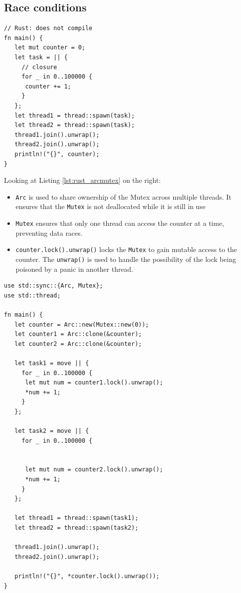 \newpage
\subsection{Race conditions}
\begin{paracol}{2}
   \colfill
\begin{lstlisting}[caption={Broken Rust code},label={lst:rust_broken}]
// Rust: does not compile
fn main() {
   let mut counter = 0;
   let task = || {
     // closure
     for _ in 0..100000 {
      counter += 1;
     }
   };
   let thread1 = thread::spawn(task);
   let thread2 = thread::spawn(task);
   thread1.join().unwrap();
   thread2.join().unwrap();
   println!("{}", counter);
}   
\end{lstlisting}

Looking at Listing \ref{lst:rust_arcmutex} on the right:\ns
\begin{itemize}
   \item \lstinline|Arc| is used to share ownership of the Mutex across multiple threads. It ensures that the \lstinline|Mutex| is not deallocated while it is still in use
   
   \item \lstinline|Mutex| ensures that only one thread can access the counter at a time, preventing data races.
   
   \item \lstinline|counter.lock().unwrap()| locks the \lstinline|Mutex| to gain mutable access to the counter. The \lstinline|unwrap()| is used to handle the possibility of the lock being poisoned by a panic in another thread.
\end{itemize}
   \colfill
   \switchcolumn

\begin{lstlisting}[caption={Fixed code with \lstinline|Arc<Mutex<T>>| and \lstinline|move|},label={lst:rust_arcmutex}]
use std::sync::{Arc, Mutex};
use std::thread;

fn main() {
   let counter = Arc::new(Mutex::new(0));
   let counter1 = Arc::clone(&counter);
   let counter2 = Arc::clone(&counter);

   let task1 = move || {
     for _ in 0..100000 {
      let mut num = counter1.lock().unwrap();
      *num += 1;
     }
   };

   let task2 = move || {
     for _ in 0..100000 {
      

      let mut num = counter2.lock().unwrap();
      *num += 1;
     }
   };

   let thread1 = thread::spawn(task1);
   let thread2 = thread::spawn(task2);

   thread1.join().unwrap();
   thread2.join().unwrap();

   println!("{}", *counter.lock().unwrap());
}   
\end{lstlisting}

\end{paracol}


